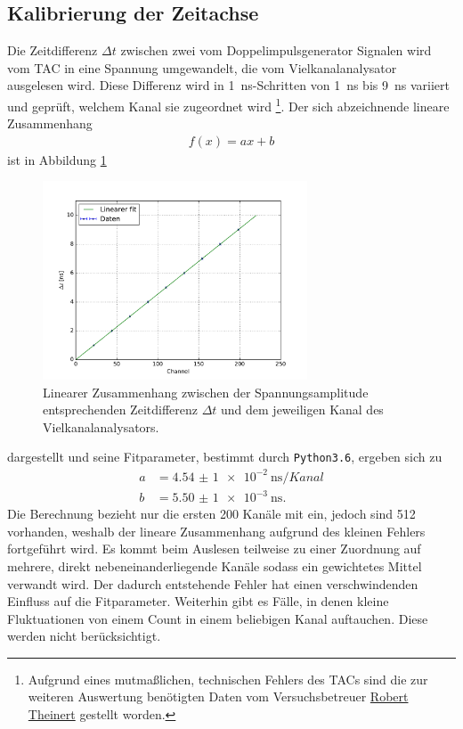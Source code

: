\subsection{Kalibrierung der Zeitachse}
Die Zeitdifferenz $\Delta t$ zwischen zwei vom Doppelimpulsgenerator Signalen wird vom TAC in eine Spannung umgewandelt, die vom Vielkanalanalysator 
ausgelesen wird. Diese Differenz wird in \SI{1}{\nano\second}-Schritten von \SI{1}{\nano\second} bis \SI{9}{\nano\second} variiert und geprüft,
welchem Kanal sie zugeordnet wird \footnote[1]{Aufgrund eines mutmaßlichen, technischen Fehlers des TACs sind die zur weiteren Auswertung benötigten
Daten vom Versuchsbetreuer \href{robert.theinert@tu-dortmund.de}{Robert Theinert} gestellt worden.}. Der sich abzeichnende lineare Zusammenhang
\begin{align}
 f(x) = ax + b
\end{align}
ist in Abbildung \ref{pic:linfit} 
\begin{figure}[t]
 \includegraphics[width=0.7\textwidth]{../pics/linFit}
 \caption{Linearer Zusammenhang zwischen der Spannungsamplitude entsprechenden Zeitdifferenz $\Delta t$ und dem jeweiligen Kanal des 
 Vielkanalanalysators.}
 \label{pic:linfit}
\end{figure}
dargestellt und seine Fitparameter, bestimmt durch \texttt{Python3.6}, ergeben sich zu
\begin{align}
 a&= \SI{4,54(1)e-2}{\nano\second\per Kanal}\\
 b&= \SI{5,50(1)e-3}{\nano\second}.
 \label{eq:kalibparams}
\end{align}
Die Berechnung bezieht nur die ersten 200 Kanäle mit ein, jedoch sind 512 vorhanden, weshalb der lineare Zusammenhang aufgrund des kleinen Fehlers
fortgeführt wird.
Es kommt beim Auslesen teilweise zu einer Zuordnung auf mehrere, direkt nebeneinanderliegende Kanäle sodass ein gewichtetes Mittel verwandt wird.
Der dadurch entstehende Fehler hat einen verschwindenden Einfluss auf die Fitparameter. Weiterhin gibt es Fälle, in denen kleine Fluktuationen
von einem Count in einem beliebigen Kanal auftauchen. Diese werden nicht berücksichtigt.
